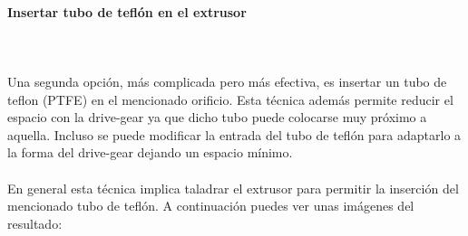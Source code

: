 \documentclass[11pt,a4paper]{article}
\begin{document}
			\paragraph{Insertar tubo de teflón en el extrusor}\mbox{}\\\\
Una segunda opción, más complicada pero más efectiva, es insertar un tubo de teflon (PTFE) en el mencionado orificio. Esta técnica además permite reducir el espacio con la drive-gear ya que dicho tubo puede colocarse muy próximo a aquella. Incluso se puede modificar la entrada del tubo de teflón para adaptarlo a la forma del drive-gear dejando un espacio mínimo.
\\\\
En general esta técnica implica taladrar el extrusor para permitir la inserción del mencionado tubo de teflón. A continuación puedes ver unas imágenes del resultado:
\end{document}
